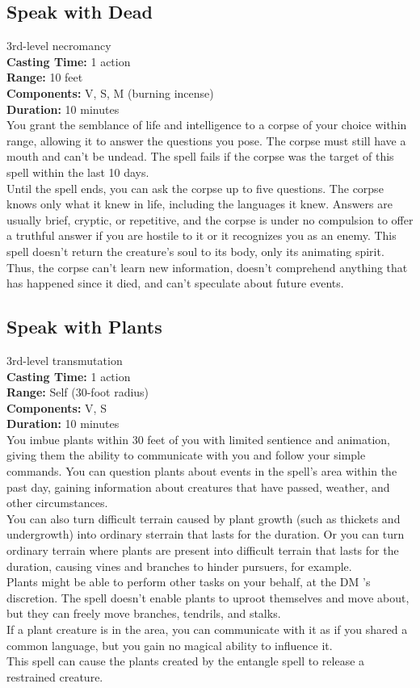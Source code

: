 \documentclass[11pt, A4paper, english]{article}
\begin{document}
		\subsection{Speak with Dead}
3rd-level necromancy \\
\textbf{Casting Time:} 1 action \\
\textbf{Range:} 10 feet \\
\textbf{Components:} V, S, M (burning incense) \\
\textbf{Duration:} 10 minutes \\
You grant the semblance of life and intelligence to a corpse of your choice within range, allowing it to answer the questions you pose. The corpse must still have a mouth and can’t be undead. The spell fails if the corpse was the target of this spell within the last 10 days. \\
Until the spell ends, you can ask the corpse up to five questions. The corpse knows only what it knew in life, including the languages it knew. Answers are usually brief, cryptic, or repetitive, and the corpse is under no compulsion to offer a truthful answer if you are hostile to it or it recognizes you as an enemy. This spell doesn’t return the creature’s soul to its body, only its animating spirit. Thus, the corpse can’t learn new information, doesn’t comprehend anything that has happened since it died, and can’t speculate about future events.

		\subsection{Speak with Plants}
3rd-level transmutation \\
\textbf{Casting Time:} 1 action \\
\textbf{Range:} Self (30-foot radius) \\
\textbf{Components:} V, S \\
\textbf{Duration:} 10 minutes \\
You imbue plants within 30 feet of you with limited sentience and animation, giving them the ability to communicate with you and follow your simple commands. You can question plants about events in the spell’s area within the past day, gaining information about creatures that have passed, weather, and other circumstances. \\
You can also turn difficult terrain caused by plant growth (such as thickets and undergrowth) into ordinary sterrain that lasts for the duration. Or you can turn ordinary terrain where plants are present into difficult terrain that lasts for the duration, causing vines and branches to hinder pursuers, for example. \\
Plants might be able to perform other tasks on your behalf, at the DM ’s discretion. The spell doesn’t enable plants to uproot themselves and move about, but they can freely move branches, tendrils, and stalks. \\
If a plant creature is in the area, you can communicate with it as if you shared a common language, but you gain no magical ability to influence it. \\
This spell can cause the plants created by the entangle spell to release a restrained creature.
\end{document}
